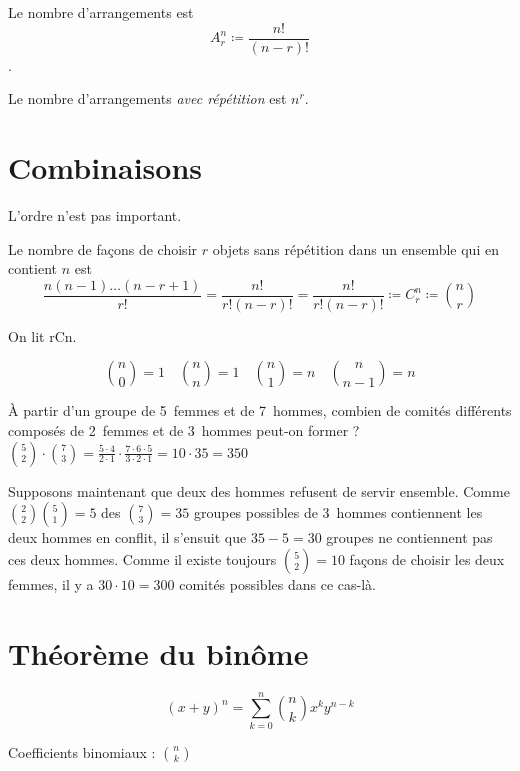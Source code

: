 
Le nombre d’arrangements est \[A_r^n \coloneqq \frac{n!}{(n-r)!}\].

Le nombre d’arrangements \emph{avec répétition} est $n^r$.



\section{Combinaisons}

L’ordre n’est pas important.


Le nombre de façons de choisir $r$ objets sans répétition dans un ensemble qui en contient $n$ est 
\[\frac{n(n-1)\dots(n-r+1)}{r!} = \frac{n!}{r!(n-r)!} = \frac{n!}{r!(n-r)!} \coloneqq C_r^n \coloneqq \binom{n}{r}
\]

On lit \og rCn\fg{}.

\[\binom{n}{0} = 1 \quad \binom{n}{n} = 1 \quad \binom{n}{1} = n \quad \binom{n}{n-1} = n\]

\noindent À partir d’un groupe de 5~femmes et de 7~hommes, combien de comités différents composés
de 2~femmes et de 3~hommes peut-on former ?
 $\binom{5}{2} \cdot \binom{7}{3} = \frac{5 \cdot 4}{2 \cdot 1} \cdot \frac{7 \cdot 6 \cdot 5}{3 \cdot 2 \cdot 1} = 10 \cdot 35 = 350$

\noindent Supposons maintenant que deux des hommes refusent de servir ensemble. Comme $\binom{2}{2}\binom{5}{1}=5$ des $\binom{7}{3}=35$ groupes possibles de 3~hommes contiennent les deux hommes en conflit, il s’ensuit que $35-5=30$ groupes ne contiennent pas ces deux hommes. Comme il existe toujours $\binom{5}{2}=10$ façons de choisir les deux femmes, il y a $30 \cdot 10 = 300$ comités possibles dans ce cas-là.


\section{Théorème du binôme}\label{sec:theoremeBinome}
\[(x+y)^n = \sum_{k=0}^{n}\binom{n}{k}x^ky^{n-k}\]

Coefficients binomiaux : $\binom{n}{k}$

